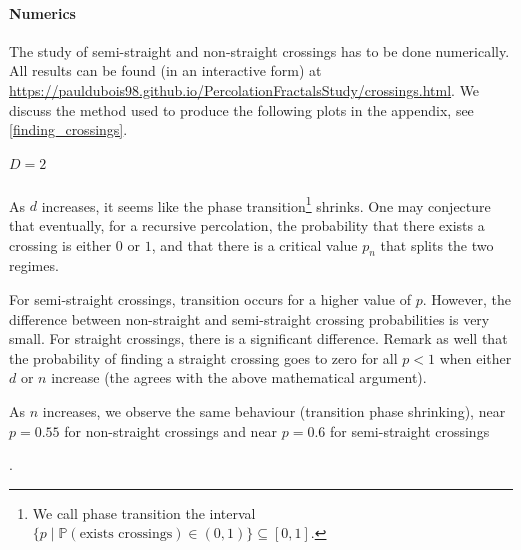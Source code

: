 \paragraph{Numerics}
The study of semi-straight and non-straight crossings has to be done numerically.
All results can be found (in an interactive form) at \url{https://pauldubois98.github.io/PercolationFractalsStudy/crossings.html}.
We discuss the method used to produce the following plots in the appendix, see \ref{finding_crossings}.

\subparagraph{$D=2$}
As $d$ increases, it seems like the phase transition\footnote{We call phase transition the interval $\{ p \mid \mathbb{P}(\text{exists crossings}) \in (0,1) \} \subseteq \left[ 0,1 \right]$.} shrinks.
One may conjecture that eventually, for a recursive percolation, the probability that there exists a crossing is either $0$ or $1$, and that there is a critical value $p_n$ that splits the two regimes.

For semi-straight crossings, transition occurs for a higher value of $p$\footnotemark.
However, the difference between non-straight and semi-straight crossing probabilities is very small.
For straight crossings, there is a significant difference.
Remark as well that the probability of finding a straight crossing goes to zero for all $p<1$ when either $d$ or $n$ increase (the agrees with the above mathematical argument).

As $n$ increases, we observe the same behaviour (transition phase shrinking), near $p=0.55$ for non-straight crossings and near $p=0.6$ for semi-straight crossings\addtocounter{footnote}{-1}\footnotemark.


